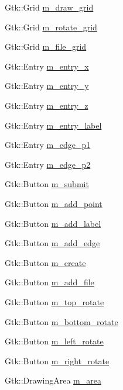 \begin{DoxyCompactItemize}
\item 
Gtk\+::\+Grid \hyperlink{class_construct_window_a1bcef215bf6404b2c5222909952500e0}{m\+\_\+draw\+\_\+grid}
\item 
Gtk\+::\+Grid \hyperlink{class_construct_window_ab96011e590f3138153ef221be1608865}{m\+\_\+rotate\+\_\+grid}
\item 
Gtk\+::\+Grid \hyperlink{class_construct_window_a5d9e8a08026b6381853aa5d7ddf8d062}{m\+\_\+file\+\_\+grid}
\item 
Gtk\+::\+Entry \hyperlink{class_construct_window_a11982439b17251d83fc2d2eadd5b4c0a}{m\+\_\+entry\+\_\+x}
\item 
Gtk\+::\+Entry \hyperlink{class_construct_window_ad05c6e1379b84f795ae4b495d3621a1d}{m\+\_\+entry\+\_\+y}
\item 
Gtk\+::\+Entry \hyperlink{class_construct_window_a21e505c7b74d70e3f37ca94c6dc79bbc}{m\+\_\+entry\+\_\+z}
\item 
Gtk\+::\+Entry \hyperlink{class_construct_window_a031a78a66f7c69da3395c25c8d84c699}{m\+\_\+entry\+\_\+label}
\item 
Gtk\+::\+Entry \hyperlink{class_construct_window_a49425c4f8cc175011f608ef26598ecc0}{m\+\_\+edge\+\_\+p1}
\item 
Gtk\+::\+Entry \hyperlink{class_construct_window_a2cd8576e8bcd49dfedaa82c65766028e}{m\+\_\+edge\+\_\+p2}
\item 
Gtk\+::\+Button \hyperlink{class_construct_window_a855cdd124dc2fb10b911e88b5d020a59}{m\+\_\+submit}
\item 
Gtk\+::\+Button \hyperlink{class_construct_window_a18879d0b8580c30589fd3dcd2a3de7d6}{m\+\_\+add\+\_\+point}
\item 
Gtk\+::\+Button \hyperlink{class_construct_window_a1dd9adca873008e41db7a7610e9cd1fb}{m\+\_\+add\+\_\+label}
\item 
Gtk\+::\+Button \hyperlink{class_construct_window_a8eb470f90db79f60612a0389d3d9a93f}{m\+\_\+add\+\_\+edge}
\item 
Gtk\+::\+Button \hyperlink{class_construct_window_acaf528e94f75726e4168b6b21e57a4c1}{m\+\_\+create}
\item 
Gtk\+::\+Button \hyperlink{class_construct_window_a62de6f36977a3b994c45a8792aeb39e2}{m\+\_\+add\+\_\+file}
\item 
Gtk\+::\+Button \hyperlink{class_construct_window_a2092e74c068ec46139a1883b1cb4b79e}{m\+\_\+top\+\_\+rotate}
\item 
Gtk\+::\+Button \hyperlink{class_construct_window_ad05f416b88027120b3b5091c7f56994d}{m\+\_\+bottom\+\_\+rotate}
\item 
Gtk\+::\+Button \hyperlink{class_construct_window_a4a4ded63890f51ad62cebe7599294fed}{m\+\_\+left\+\_\+rotate}
\item 
Gtk\+::\+Button \hyperlink{class_construct_window_a6992f35a1c502bfb48743730d4c59273}{m\+\_\+right\+\_\+rotate}
\item 
Gtk\+::\+Drawing\+Area \hyperlink{class_construct_window_a7cfd32007cdcb14ec957c90f7293004f}{m\+\_\+area}
\end{DoxyCompactItemize}


